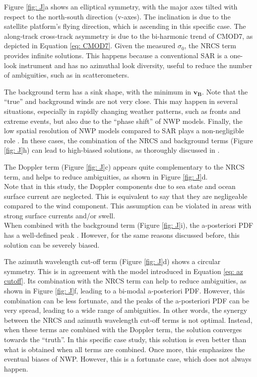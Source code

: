 Figure \ref{fig: J}a shows an elliptical symmetry, with the major axes tilted
with respect to the north-south direction (v-axes). The inclination is due to
the satellite platform's flying direction, which is ascending in this specific
case. The along-track cross-track asymmetry is due to the bi-harmonic trend of
CMOD7, as depicted in Equation \ref{eq: CMOD7}. Given the measured
$\sigma_{0}$, the \ac{NRCS} term provides infinite solutions. This happens
because a conventional \ac{SAR} is a one-look instrument and has no azimuthal
look diversity, useful to reduce the number of ambiguities, such as in
scatterometers.

The background term has a sink shape, with the minimum in $\mathbf{v_{B}}$.
Note that the ``true'' and background winds are not very close. This may happen
in several situations, especially in rapidly changing weather patterns, such as
fronts and extreme events, but also due to the ``phase shift'' of \ac{NWP} models.
Finally, the low spatial resolution of \ac{NWP} models compared to \ac{SAR} plays a
non-negligible role \cite{VogelzangJGRO2011}. In these cases, the combination
of the \ac{NRCS} and background terms (Figure \ref{fig: J}h) can lead to
high-biased solutions, as thoroughly discussed in \cite{PortabellaJGRO2002}.

The Doppler term (Figure \ref{fig: J}c) appears quite complementary to the
\ac{NRCS} term, and helps to reduce ambiguities, as shown in Figure \ref{fig:
J}d. \\
Note that in this study, the Doppler components due to sea state and ocean surface current are neglected. This is equivalent to say that they are negligeable compared to the wind component. This assumption can be violated in areas with strong surface currents and/or swell. \\
When combined with the background term (Figure \ref{fig: J}i), the
a-posteriori \ac{PDF} has a well-defined peak \cite{MoucheTGRS2012}. However,
for the same reasons discussed before, this solution can be severely biased.

The azimuth wavelength cut-off term (Figure \ref{fig: J}d) shows a circular
symmetry. This is in agreement with the model introduced in Equation \ref{eq:
az cutoff}. Its combination with the \ac{NRCS} term can help to reduce
ambiguities, as shown in Figure \ref{fig: J}f, leading to a bi-modal
a-posteriori \ac{PDF}. However, this combination can be less fortunate, and the
peaks of the a-posteriori \ac{PDF} can be very spread, leading to a wide range
of ambiguities. In other words, the synergy between the \ac{NRCS} and azimuth
wavelength cut-off terms is not optimal. Instead, when these terms are combined
with the Doppler term, the solution converges towards the ``truth''. In this
specific case study, this solution is even better than what is obtained when
all terms are combined. Once more, this emphasizes the eventual biases of
\ac{NWP}. However, this is a fortunate case, which does not always happen. 



